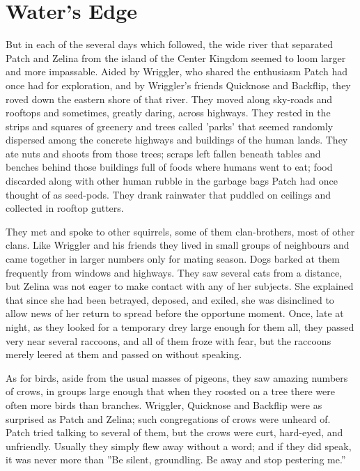 \documentclass[12pt]{book}
\begin{document}
\section{Water's Edge}

 But in each of the several days which followed, the wide river that separated Patch and Zelina from the island of the Center Kingdom seemed to loom larger and more impassable. Aided by Wriggler, who shared the enthusiasm Patch had once had for exploration, and by Wriggler's friends Quicknose and Backflip, they roved down the eastern shore of that river. They moved along sky-roads and rooftops and sometimes, greatly daring, across highways. They rested in the strips and squares of greenery and trees called 'parks' that seemed randomly dispersed among the concrete highways and buildings of the human lands. They ate nuts and shoots from those trees; scraps left fallen beneath tables and benches behind those buildings full of foods where humans went to eat; food discarded along with other human rubble in the garbage bags Patch had once thought of as seed-pods. They drank rainwater that puddled on ceilings and collected in rooftop gutters.\par
 They met and spoke to other squirrels, some of them clan-brothers, most of other clans. Like Wriggler and his friends they lived in small groups of neighbours and came together in larger numbers only for mating season. Dogs barked at them frequently from windows and highways. They saw several cats from a distance, but Zelina was not eager to make contact with any of her subjects. She explained that since she had been betrayed, deposed, and exiled, she was disinclined to allow news of her return to spread before the opportune moment. Once, late at night, as they looked for a temporary drey large enough for them all, they passed very near several raccoons, and all of them froze with fear, but the raccoons merely leered at them and passed on without speaking.\par
 As for birds, aside from the usual masses of pigeons, they saw amazing numbers of crows, in groups large enough that when they roosted on a tree there were often more birds than branches. Wriggler, Quicknose and Backflip were as surprised as Patch and Zelina; such congregations of crows were unheard of. Patch tried talking to several of them, but the crows were curt, hard-eyed, and unfriendly. Usually they simply flew away without a word; and if they did speak, it was never more than ''Be silent, groundling. Be away and stop pestering me.''\par
\end{document}

